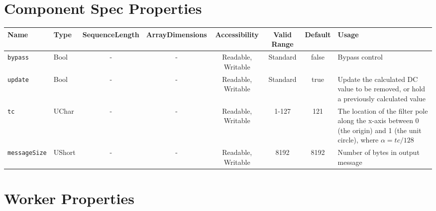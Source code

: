 \documentclass{article}
\begin{document}
	\begin{landscape}
		\section*{Component Spec Properties}
		\begin{scriptsize}
			\begin{tabular}{|p{3cm}|p{1.5cm}|c|c|c|c|c|p{7cm}|}
				\hline
				\rowcolor{blue}
				Name               & Type   & SequenceLength & ArrayDimensions & Accessibility      & Valid Range & Default & Usage                                                                                                                    \\
				\hline
				\verb+bypass+      & Bool   & -              & -               & Readable, Writable & Standard    & false   & Bypass control                                                                                                           \\					\hline
				\verb+update+      & Bool   & -              & -               & Readable, Writable & Standard    & true    & Update the calculated DC value to be removed, or hold a previously calculated value                                      \\
				\hline
				\verb+tc+          & UChar  & -              & -               & Readable, Writable & 1-127       & 121     & The location of the filter pole along the x-axis between 0 (the origin) and 1 (the unit circle), where $\alpha = tc/128$ \\
				\hline
				\verb+messageSize+ & UShort & -              & -               & Readable, Writable & 8192        & 8192    & Number of bytes in output message                                                                                        \\
				\hline
			\end{tabular}
		\end{scriptsize}

		\section*{Worker Properties}

\end{landscape}
\end{document}
